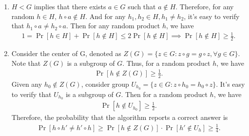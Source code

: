 \begin{answer}
	\begin{enumerate}[label=\alph*).]
		\item $H < G$ implies that there exists $a \in G$ such that $a \notin H$. Therefore, for any random $h \in H$, $h \circ a \notin H$. And for any $h_1, h_2 \in H, h_1\neq h_2$, it's easy to verify that $h_1\circ a \neq h_2\circ a$. 
		Then for any random product $h$, we have 
		\begin{align*}
			1 = \Pr[h\in H] + \Pr[h\notin H] \le 2\Pr[h\notin H] \implies \Pr[h\notin H] \ge \frac{1}{2}.
		\end{align*}
		\item Consider the center of G, denoted as $Z(G) = \{z\in G: z\circ g = g\circ z, \forall g\in G\}$. Note that $Z(G)$ is a subgroup of $G$. 
		Thus, for a random product $h$, we have
		\begin{align*}
			\Pr[h\notin Z(G)] \ge \frac{1}{2}.
		\end{align*}
		Given any $h_0\notin Z(G)$, consider group $U_{h_0} = \{z \in G: z\circ h_0 = h_0\circ z\}$. It's easy to verify that $U_{h_0}$ is a subgroup of $G$. 
		Then for a random product $h$, we have
		\begin{align*}
			\Pr[h\notin U_{h_0}] \ge \frac{1}{2}.
		\end{align*}
		Therefore, the probability that the algorithm reports a correct answer is
		\begin{align*}
			\Pr[h\circ h'\neq h'\circ h] \ge \Pr[h\notin Z(G)]\cdot \Pr[h'\notin U_{h}] \ge \frac{1}{4}.
		\end{align*}
	\end{enumerate}
	\ed
\end{answer}